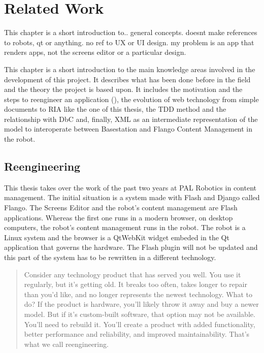 \chapter{Related Work}
This chapter is a short introduction to.. general concepts. doesnt make references to
robots, qt or anything. no ref to UX or UI design. my problem is an app that renders
apps, not the screens editor or a particular design.

This chapter is a short introduction to the main knowledge areas involved in the development of this project.
It describes what has been done before in the field and the theory the project is based upon.
It includes the motivation and the steps to reengineer an application (\cite{Pressman:2007}), the evolution of web technology from simple documents to \ac{RIA} like the one of this thesis, the \ac{TDD} method and the relationship with \ac{DbC} and, finally, \ac{XML} as an intermediate representation of the model to interoperate between Basestation and Flango Content Management in the robot.

\section{Reengineering}
\label{sec:reengineering}
This thesis takes over the work of the past two years at PAL Robotics in content management.
The initial situation is a system made with Flash and Django called Flango.
The Screens Editor and the robot's content management are Flash applications.
Whereas the first one runs in a modern browser, on desktop computers, the robot's content management runs in the robot.
The robot is a Linux system and the browser is a QtWebKit widget embeded in the Qt application that governs the hardware.
The Flash plugin will not be updated and this part of the system has to be rewritten in a different technology.

\begin{quote} 
Consider any technology product that has served you well. 
You use it regularly, but it's getting old. 
It breaks too often, takes longer to repair than you'd like, and no longer represents the newest technology.
What to do? If the product is hardware, you'll likely throw it away and buy a newer model.
But if it's custom-built software, that option may not be available. 
You'll need to rebuild it. 
You'll create a product with added functionality, better performance and reliability, and improved maintainability.
That's what we call reengineering. \cite{Pressman:2007}
\end{quote}

